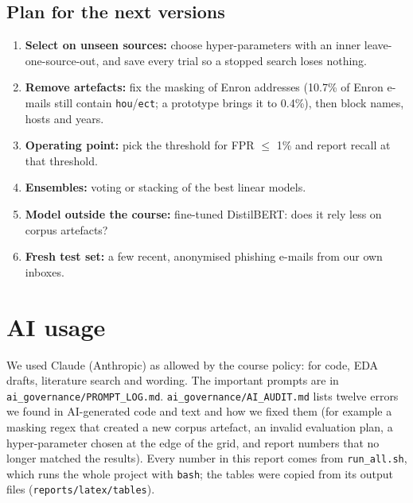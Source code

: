 \documentclass[11pt,a4paper]{article}
\begin{document}
\subsection{Plan for the next versions}
\begin{enumerate}
\item \textbf{Select on unseen sources:} choose hyper-parameters with an inner leave-one-source-out, and save every trial so a stopped search loses nothing.
\item \textbf{Remove artefacts:} fix the masking of Enron addresses (10.7\% of Enron e-mails still contain \texttt{hou}/\texttt{ect}; a prototype brings it to 0.4\%), then block names, hosts and years.
\item \textbf{Operating point:} pick the threshold for FPR $\le$ 1\% and report recall at that threshold.
\item \textbf{Ensembles:} voting or stacking of the best linear models.
\item \textbf{Model outside the course:} fine-tuned DistilBERT: does it rely less on corpus artefacts?
\item \textbf{Fresh test set:} a few recent, anonymised phishing e-mails from our own inboxes.
\end{enumerate}

\section*{AI usage}
We used Claude (Anthropic) as allowed by the course policy: for code, EDA drafts, literature search and wording. The important prompts are in \texttt{ai\_governance/PROMPT\_LOG.md}. \texttt{ai\_governance/AI\_AUDIT.md} lists twelve errors we found in AI-generated code and text and how we fixed them (for example a masking regex that created a new corpus artefact, an invalid evaluation plan, a hyper-parameter chosen at the edge of the grid, and report numbers that no longer matched the results). Every number in this report comes from \texttt{run\_all.sh}, which runs the whole project with \texttt{bash}; the tables were copied from its output files (\texttt{reports/latex/tables}).
\end{document}
